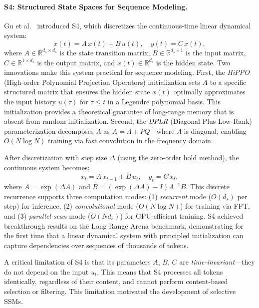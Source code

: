 \paragraph{S4: Structured State Spaces for Sequence Modeling.}
Gu et al.~\cite{gu2022efficiently} introduced S4, which discretizes the continuous-time linear dynamical system:
\begin{equation}
\dot{x}(t) = A\, x(t) + B\, u(t), \quad y(t) = C\, x(t),
\label{eq:ssm-continuous}
\end{equation}
where $A \in \mathbb{R}^{d_s \times d_s}$ is the state transition matrix, $B \in \mathbb{R}^{d_s \times 1}$ is the input matrix, $C \in \mathbb{R}^{1 \times d_s}$ is the output matrix, and $x(t) \in \mathbb{R}^{d_s}$ is the hidden state. Two innovations make this system practical for sequence modeling. First, the \emph{HiPPO} (High-order Polynomial Projection Operators) initialization sets $A$ to a specific structured matrix that ensures the hidden state $x(t)$ optimally approximates the input history $u(\tau)$ for $\tau \leq t$ in a Legendre polynomial basis. This initialization provides a theoretical guarantee of long-range memory that is absent from random initialization. Second, the \emph{DPLR} (Diagonal Plus Low-Rank) parameterization decomposes $A$ as $A = \Lambda + PQ^\top$ where $\Lambda$ is diagonal, enabling $O(N \log N)$ training via fast convolution in the frequency domain.

After discretization with step size $\Delta$ (using the zero-order hold method), the continuous system becomes:
\begin{equation}
x_t = \bar{A}\, x_{t-1} + \bar{B}\, u_t, \quad y_t = C\, x_t,
\label{eq:ssm-discrete}
\end{equation}
where $\bar{A} = \exp(\Delta A)$ and $\bar{B} = (\exp(\Delta A) - I) A^{-1} B$. This discrete recurrence supports three computation modes: (1) \emph{recurrent} mode ($O(d_s)$ per step) for inference, (2) \emph{convolutional} mode ($O(N \log N)$) for training via FFT, and (3) \emph{parallel scan} mode ($O(N d_s)$) for GPU-efficient training. S4 achieved breakthrough results on the Long Range Arena benchmark, demonstrating for the first time that a linear dynamical system with principled initialization can capture dependencies over sequences of thousands of tokens.

A critical limitation of S4 is that its parameters $A$, $B$, $C$ are \emph{time-invariant}---they do not depend on the input $u_t$. This means that S4 processes all tokens identically, regardless of their content, and cannot perform content-based selection or filtering. This limitation motivated the development of selective SSMs.

